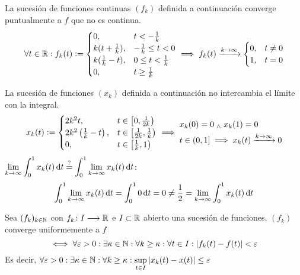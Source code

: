 \begin{ejem} %
	La sucesión de funciones continuas $(f_k)$ definida a continuación converge puntualmente a $f$ que no es continua.
	\[\forall t \in\mathbb{R} : f_k(t) \vcentcolon= \begin{cases}
			0,                & t < -\frac{1}{k}        \\
			k(t+\frac{1}{k}), & -\frac{1}{k} \leq t < 0 \\
			k(\frac{1}{k}-t), & 0\leq t < \frac{1}{k}   \\
			0,                & t\geq \frac{1}{k}
		\end{cases} \implies f_k(t)\xrightarrow{k\to\infty}\begin{cases}
			0, & t\ne 0 \\
			1, & t=0
		\end{cases}\]
\end{ejem}
\begin{ejem} %
	La sucesión de funciones $(x_k)$ definida a continuación no intercambia el límite con la integral.
	\[x_k(t) \vcentcolon= \begin{cases}
			2k^2t,                          & t\in\left[0, \frac{1}{2k}\right)           \\
			2k^2\left(\frac{1}{k}-t\right), & t\in\left[\frac{1}{2k}, \frac{1}{k}\right) \\
			0,                              & t\in\left[\frac{1}{k}, 1\right)            \\
		\end{cases}\implies \begin{aligned}
			 & x_k(0)=0 \; _{\wedge} \; x_k(1)=0                                  \\
			 & t\in (0,1] \implies x_k(t)  \xrightarrow{k\to\infty} 0
		\end{aligned}\]
	$\ds \lim_{k\to\infty} \int_{0}^1 x_k(t) \odif{t} \stackrel{?}{=} \int_{0}^1 \lim_{k\to\infty} x_k(t) \odif{t}$:
	\[ \int_{0}^1 \lim_{k\to\infty} x_k(t) \odif{t} = \int_{0}^{1} 0 \odif{t} = 0 \ne \frac{1}{2} = \lim_{k\to\infty}\int_{0}^{1} x_k(t) \odif{t}\]
\end{ejem}
\begin{defn}
	Sea $(f_k)_{k\in\mathbb{N}}$ con $f_k \colon I \longrightarrow \mathbb{R}$ e $I\subset \mathbb{R}$ abierto una sucesión de funciones, $(f_k)$ converge uniformemente a $f$
	\[\iff \forall \varepsilon > 0 : \exists \kappa \in \mathbb{N} : \forall k\geq \kappa : \forall t\in I : \left|f_k(t) - f(t)\right| < \varepsilon\]
	Es decir, $\displaystyle \forall \varepsilon > 0 : \exists \kappa \in \mathbb{N} : \forall k \geq \kappa : \sup_{t\in I} \left|x_k(t)-x(t)\right| \leq \varepsilon$
\end{defn}
